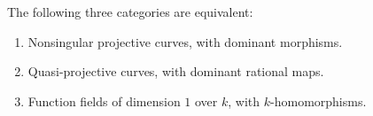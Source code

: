 The following three categories are equivalent:
\begin{enumerate}
  \item[(i)] Nonsingular projective curves, with dominant morphisms.
  \item[(ii)] Quasi-projective curves, with dominant rational maps.
  \item[(iii)] Function fields of dimension $1$ over $k$, with $k$-homomorphisms.
\end{enumerate}
